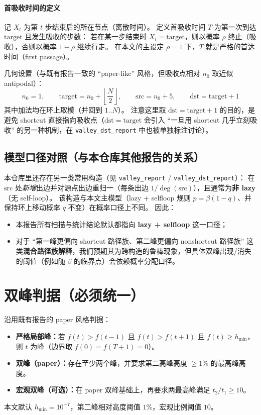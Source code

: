 \documentclass[11pt,fontset=fandol]{ctexart}
\begin{document}
\paragraph{首吸收时间的定义}
记 $X_t$ 为第 $t$ 步结束后的所在节点（离散时间）。
定义首吸收时间 $T$ 为第一次到达 $\mathrm{target}$ 且发生吸收的步数：
若在某一步结束时 $X_t=\mathrm{target}$，则以概率 $\rho$ 终止（吸收），否则以概率 $1-\rho$ 继续行走。
在本文的主设定 $\rho=1$ 下，$T$ 就是严格的首达时间（first passage）。

几何设置（与既有报告一致的 ``paper-like'' 风格，但吸收点相对 $n_0$ 取近似 antipodal）：
\[
n_0=1,\qquad
\mathrm{target} = n_0+\left\lfloor\frac{N}{2}\right\rfloor,\qquad
\mathrm{src}=n_0+5,\qquad
\mathrm{dst}=\mathrm{target}+1
\]
其中加法均在环上取模（并回到 $1..N$）。
注意这里取 $\mathrm{dst}=\mathrm{target}+1$ 的目的，是避免 shortcut 直接指向吸收点（$\mathrm{dst}=\mathrm{target}$ 会引入 ``一旦用 shortcut 几乎立刻吸收'' 的另一种机制，在 \texttt{valley\_dst\_report} 中也被单独标注讨论）。

\subsection{模型口径对照（与本仓库其他报告的关系）}
本仓库里还存在另一类常用构造（见 \texttt{valley\_report} / \texttt{valley\_dst\_report}）：
在 $\mathrm{src}$ 处\emph{新增}出边并对源点出边重归一（每条出边 $1/\deg(\mathrm{src})$），且通常为\textbf{非 lazy}（无 self-loop）。
该构造与本文主模型（lazy + selfloop 规则 $p=\beta(1-q)$、并保持环上移动概率 $q$ 不变）在概率口径上不同。
因此：
\begin{itemize}
  \item 本报告所有扫描与统计结论默认都指向 \textbf{lazy + selfloop} 这一口径；
  \item 对于 ``第一峰更偏向 shortcut 路径族、第二峰更偏向 nonshortcut 路径族'' 这类\textbf{混合路径族解释}，我们预期其为跨构造的鲁棒现象，但具体双峰出现/消失的阈值（例如随 $\beta$ 的临界点）会依赖概率分配口径。
\end{itemize}

\section{双峰判据（必须统一）}
沿用既有报告的 paper 风格判据：
\begin{itemize}
  \item \textbf{严格局部峰：}若 $f(t)>f(t-1)$ 且 $f(t)>f(t+1)$ 且 $f(t)\ge h_{\min}$，则 $t$ 为峰（边界取 $f(0)=f(T+1)=0$）。
  \item \textbf{双峰（paper）：}存在至少两个峰，并要求第二高峰高度 $\ge 1\%$ 的最高峰高度。
  \item \textbf{宏观双峰（可选）：}在 paper 双峰基础上，再要求两最高峰满足 $t_2/t_1\ge 10$。
\end{itemize}
本文默认 $h_{\min}=10^{-7}$，第二峰相对高度阈值 $1\%$，宏观比例阈值 $10$。
\end{document}
